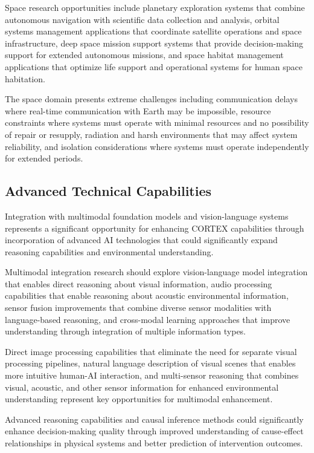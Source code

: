 Space research opportunities include planetary exploration systems that combine autonomous navigation with scientific data collection and analysis, orbital systems management applications that coordinate satellite operations and space infrastructure, deep space mission support systems that provide decision-making support for extended autonomous missions, and space habitat management applications that optimize life support and operational systems for human space habitation.

The space domain presents extreme challenges including communication delays where real-time communication with Earth may be impossible, resource constraints where systems must operate with minimal resources and no possibility of repair or resupply, radiation and harsh environments that may affect system reliability, and isolation considerations where systems must operate independently for extended periods.

\subsection{Advanced Technical Capabilities}

Integration with multimodal foundation models and vision-language systems represents a significant opportunity for enhancing CORTEX capabilities through incorporation of advanced AI technologies that could significantly expand reasoning capabilities and environmental understanding.

Multimodal integration research should explore vision-language model integration that enables direct reasoning about visual information, audio processing capabilities that enable reasoning about acoustic environmental information, sensor fusion improvements that combine diverse sensor modalities with language-based reasoning, and cross-modal learning approaches that improve understanding through integration of multiple information types.

Direct image processing capabilities that eliminate the need for separate visual processing pipelines, natural language description of visual scenes that enables more intuitive human-AI interaction, and multi-sensor reasoning that combines visual, acoustic, and other sensor information for enhanced environmental understanding represent key opportunities for multimodal enhancement.

Advanced reasoning capabilities and causal inference methods could significantly enhance decision-making quality through improved understanding of cause-effect relationships in physical systems and better prediction of intervention outcomes.

